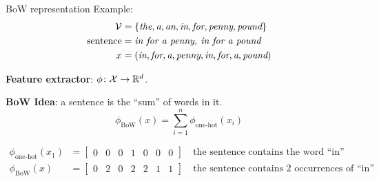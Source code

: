\documentclass[usenames,dvipsnames,notes,11pt,aspectratio=169]{beamer}
\newcommand{\pdfnote}[1]{}
\newcommand\w[1]{\textit{#1}}
\begin{document}
\begin{frame}
    {BoW representation}
    Example:
    \begin{align*}
        \mathcal{V} &= \pc{\w{the}, \w{a}, \w{an}, \w{in}, \w{for}, \w{penny}, \w{pound}}\\
        \text{sentence} &= \w{in for a penny, in for a pound} \\
        x &= \p{\w{in}, \w{for}, \w{a}, \w{penny}, \w{in}, \w{for}, \w{a}, \w{pound}}
    \end{align*}

    \textbf{Feature extractor}: $\phi\colon \mathcal{X} \rightarrow \mathbb{R}^d$.
    \pause

    \textbf{BoW Idea}: a sentence is the ``sum'' of words in it.
    $$
    \phi_{\text{BoW}}(x) = \sum_{i=1}^n \phi_{\text{one-hot}}(x_i)
    $$
    \vspace{-1em}

    \begin{align*}
        \phi_{\text{one-hot}}(x_1) &= \begin{bmatrix} 0 & 0 & 0 & 1 & 0 & 0 & 0 \end{bmatrix}
        \quad \text{the sentence contains the word ``in''}\\
        \phi_{\text{BoW}}(x)  &= \begin{bmatrix} 0 & 2 & 0 & 2 & 2 & 1 & 1 \end{bmatrix}
        \quad \text{the sentence contains 2 occurrences of ``in''}\\
    \end{align*}
\end{frame}

%
%
\end{document}
